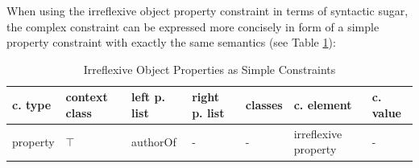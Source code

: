 \documentclass[a4paper,fontsize=11pt]{scrartcl}
\begin{document}
When using the irreflexive object property constraint in terms of syntactic sugar, 
the complex constraint can be expressed more concisely in form of a simple property constraint with exactly the same semantics (see Table \ref{tab:irreflexive-object-properties-as-simple-constraints}):


\begin{table}[H]
  \scriptsize
  \sffamily
  \vspace{0cm}
	\caption{Irreflexive Object Properties as Simple Constraints}
	\label{tab:irreflexive-object-properties-as-simple-constraints}
	\centering
		\begin{tabular}{l|l|l|l|l|l|l}
      \textbf{c. type} & \textbf{context class} & \textbf{left p. list} & \textbf{right p. list} & \textbf{classes} & \textbf{c. element} & \textbf{c. value} \\
      \hline
property & $\top$ & authorOf & - & - & irreflexive property & - \\
		\end{tabular}
\end{table}
\end{document}
